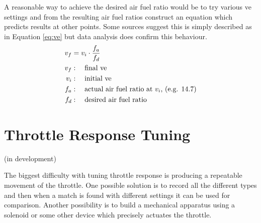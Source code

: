 \documentclass{article}
\begin{document}
A reasonable way to achieve the desired air fuel ratio would be to try
various ve settings and from the resulting air fuel ratios construct
an equation which predicts results at other points.
Some sources suggest this is simply described as in Equation \ref{eq:ve}
but data analysis does confirm this behaviour.
\begin{align}\label{eq:ve}
v_f &= v_i \cdot \frac{f_a}{f_d} \\
 v_f &: \quad \mbox{final ve} \notag \\
 v_i &: \quad \mbox{initial ve} \notag \\
 f_a &: \quad \mbox{actual air fuel ratio at $v_i$, (e.g. $14.7$)} \notag \\
 f_d &: \quad \mbox{desired air fuel ratio} \notag
\end{align}


\section{Throttle Response Tuning}
(in development)

The biggest difficulty with tuning throttle response is producing
a repeatable movement of the throttle.
One possible solution is to record all the different types and then
when a match is found with different settings it can be used for
comparison.
Another possibility is to build a mechanical apparatus using a solenoid
or some other device which precisely actuates the throttle.



\pagebreak

%
%
%


\end{document}
